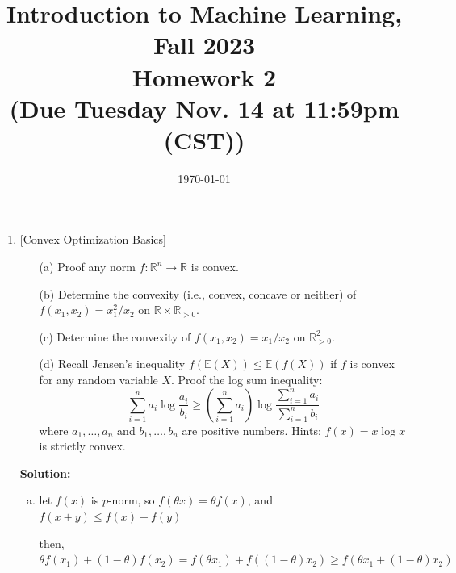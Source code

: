 \documentclass[10pt]{article}
\begin{document}
\date{\today}
\title{Introduction to Machine Learning, Fall 2023 \\
	Homework 2\\
	\small (Due Tuesday Nov. 14 at 11:59pm (CST))}
\maketitle

\begin{enumerate}[1.]


	\item {} [Convex Optimization Basics]
	      \begin{itemize}
		      \item[(a)] Proof any norm $f:\mathbb{R}^{n}\rightarrow\mathbb{R}$ is convex.~
		      \item[(b)] Determine the convexity (i.e., convex, concave or neither) of $f(x_1,x_2)=x_1^2/x_2$ on $\mathbb{R}\times\mathbb{R}_{>0}$.~
		      \item[(c)] Determine the convexity of $f(x_1,x_2)=x_1/x_2$ on $\mathbb{R}_{>0}^{2}$.~
			  \item[(d)] Recall Jensen's inequality $f(\mathbb{E}(X)) \leq \mathbb{E}(f(X))$ if $f$ is convex for any random variable $X$. 
			  Proof the log sum inequality: 
			  \[
				\sum_{i=1}^{n} a_i \log \frac{a_i}{b_i} \geq \left( \sum_{i=1}^{n} a_i\right) \log \frac{\sum_{i=1}^{n} a_i}{\sum_{i=1}^{n} b_i} 
			  \]
			  where $a_1,\ldots,a_n$ and $b_1,\ldots,b_n$ are positive numbers. Hints: $f(x)=x\log x$ is strictly convex.~
	      \end{itemize}


		  \textbf{Solution:}
		  \begin{enumerate}[(a)]
			\item
			let $f(x)$ is $p$-norm, so $f(\theta x)=\theta f(x)$, and $f(x+y)\leq f(x)+f(y)$

			then, $\theta f(x_1)+(1-\theta)f(x_2)=f(\theta x_1)+f((1-\theta)x_2)\geq f(\theta x_1+(1-\theta)x_2)$


\end{enumerate}
\end{enumerate}
\end{document}
